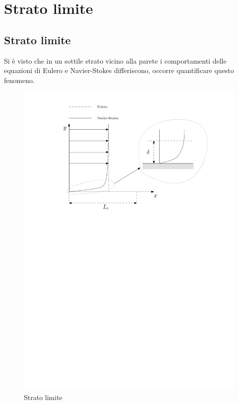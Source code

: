%
\section{Strato limite}

\subsection{Strato limite}
Si è visto che in un sottile strato vicino alla parete i comportamenti delle equazioni di Eulero e Navier-Stokes differiscono, occorre quantificare questo fenomeno.
	\begin{figure}[ht]
		\includegraphics[scale=0.85]{./7.4 Strato limite/7.4-1}
		\centering
		\caption{Strato limite}
	\end{figure}
%

